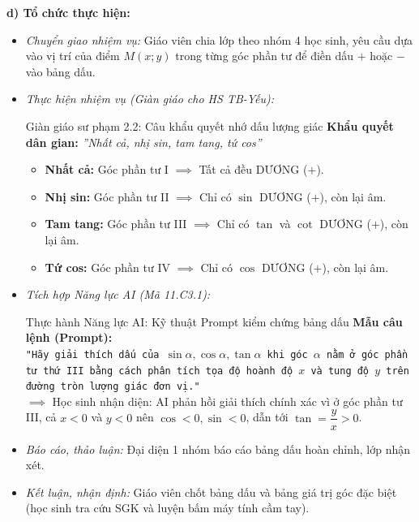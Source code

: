 \documentclass[12pt, a4paper]{article}
\begin{document}
\textbf{d) Tổ chức thực hiện:}
\begin{itemize}[leftmargin=0.6cm]
    \item \textit{Chuyển giao nhiệm vụ:} Giáo viên chia lớp theo nhóm 4 học sinh, yêu cầu dựa vào vị trí của điểm $M(x; y)$ trong từng góc phần tư để điền dấu $+$ hoặc $-$ vào bảng dấu.
    \item \textit{Thực hiện nhiệm vụ (Giàn giáo cho HS TB-Yếu):}
    \begin{scaffoldbox}{Giàn giáo sư phạm 2.2: Câu khẩu quyết nhớ dấu lượng giác}
        \textbf{Khẩu quyết dân gian:} \textit{''Nhất cả, nhị sin, tam tang, tứ cos''}
        \begin{itemize}[leftmargin=0.5cm]
            \item \textbf{Nhất cả:} Góc phần tư I $\implies$ Tất cả đều DƯƠNG ($+$).
            \item \textbf{Nhị sin:} Góc phần tư II $\implies$ Chỉ có $\sin$ DƯƠNG ($+$), còn lại âm.
            \item \textbf{Tam tang:} Góc phần tư III $\implies$ Chỉ có $\tan$ và $\cot$ DƯƠNG ($+$), còn lại âm.
            \item \textbf{Tứ cos:} Góc phần tư IV $\implies$ Chỉ có $\cos$ DƯƠNG ($+$), còn lại âm.
        \end{itemize}
    \end{scaffoldbox}
    \item \textit{Tích hợp Năng lực AI (Mã 11.C3.1):}
    \begin{aibox}{Thực hành Năng lực AI: Kỹ thuật Prompt kiểm chứng bảng dấu}
        \textbf{Mẫu câu lệnh (Prompt):}\\
        \texttt{"Hãy giải thích dấu của $\sin\alpha, \cos\alpha, \tan\alpha$ khi góc $\alpha$ nằm ở góc phần tư thứ III bằng cách phân tích tọa độ hoành độ $x$ và tung độ $y$ trên đường tròn lượng giác đơn vị."}\\
        $\implies$ Học sinh nhận diện: AI phản hồi giải thích chính xác vì ở góc phần tư III, cả $x < 0$ và $y < 0$ nên $\cos < 0, \sin < 0$, dẫn tới $\tan = \dfrac{y}{x} > 0$.
    \end{aibox}
    \item \textit{Báo cáo, thảo luận:} Đại diện 1 nhóm báo cáo bảng dấu hoàn chỉnh, lớp nhận xét.
    \item \textit{Kết luận, nhận định:} Giáo viên chốt bảng dấu và bảng giá trị góc đặc biệt (học sinh tra cứu SGK và luyện bấm máy tính cầm tay).
\end{itemize}
\end{document}
